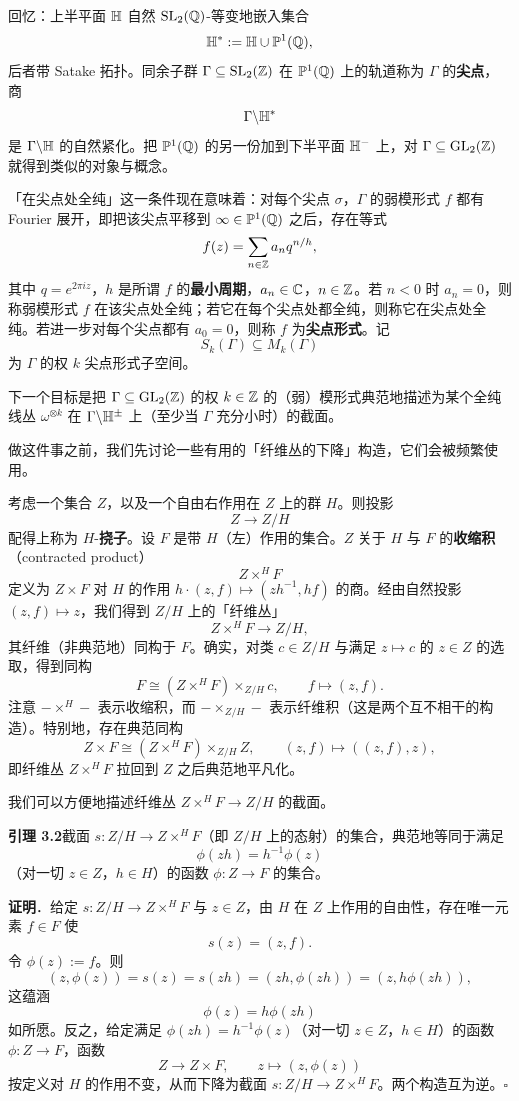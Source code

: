 回忆：上半平面 $\mathbb{H}$ 自然 $\operatorname{SL}_2(\mathbb{Q})$-等变地嵌入集合
\[
\mathbb{H}^*:=\mathbb{H}\cup\mathbb{P}^1(\mathbb{Q}),
\]
后者带 Satake 拓扑。同余子群 $\Gamma\subseteq\operatorname{SL}_2(\mathbb{Z})$ 在 $\mathbb{P}^1(\mathbb{Q})$ 上的轨道称为 $\Gamma$ 的\textbf{尖点}，商
\[
\Gamma\backslash\mathbb{H}^*
\]
是 $\Gamma\backslash\mathbb{H}$ 的自然紧化。把 $\mathbb{P}^1(\mathbb{Q})$ 的另一份加到下半平面 $\mathbb{H}^-$ 上，对 $\Gamma\subseteq\operatorname{GL}_2(\mathbb{Z})$ 就得到类似的对象与概念。

「在尖点处全纯」这一条件现在意味着：对每个尖点 $\sigma$，$\Gamma$ 的弱模形式 $f$ 都有 Fourier 展开，即把该尖点平移到 $\infty\in\mathbb{P}^1(\mathbb{Q})$ 之后，存在等式
\[
f(z)=\sum_{n\in\mathbb{Z}}a_nq^{n/h},
\]
其中 $q=e^{2\pi iz}$，$h$ 是所谓 $f$ 的\textbf{最小周期}，$a_n\in\mathbb{C}$，$n\in\mathbb{Z}$。若 $n<0$ 时 $a_n=0$，则称弱模形式 $f$ 在该尖点处全纯；若它在每个尖点处都全纯，则称它在尖点处全纯。若进一步对每个尖点都有 $a_0=0$，则称 $f$ 为\textbf{尖点形式}。记
\[
S_k(\Gamma)\subseteq M_k(\Gamma)
\]
为 $\Gamma$ 的权 $k$ 尖点形式子空间。

下一个目标是把 $\Gamma\subseteq\operatorname{GL}_2(\mathbb{Z})$ 的权 $k\in\mathbb{Z}$ 的（弱）模形式典范地描述为某个全纯线丛
$\omega^{\otimes k}$ 在 $\Gamma\backslash\mathbb{H}^\pm$ 上（至少当 $\Gamma$ 充分小时）的截面。

做这件事之前，我们先讨论一些有用的「纤维丛的下降」构造，它们会被频繁使用。

考虑一个集合 $Z$，以及一个自由右作用在 $Z$ 上的群 $H$。则投影
\[
Z\to Z/H
\]
配得上称为 $H$-\textbf{挠子}。设 $F$ 是带 $H$（左）作用的集合。$Z$ 关于 $H$ 与 $F$ 的\textbf{收缩积}（contracted product）
\[
Z\times^HF
\]
定义为 $Z\times F$ 对 $H$ 的作用 $h\cdot(z,f)\mapsto(zh^{-1},hf)$ 的商。经由自然投影 $(z,f)\mapsto z$，我们得到 $Z/H$ 上的「纤维丛」
\[
Z\times^HF\to Z/H,
\]
其纤维（非典范地）同构于 $F$。确实，对类 $c\in Z/H$ 与满足 $z\mapsto c$ 的 $z\in Z$ 的选取，得到同构
\[
F\cong(Z\times^HF)\times_{Z/H}c,\qquad f\mapsto(z,f).
\]
注意 $-\times^H-$ 表示收缩积，而 $-\times_{Z/H}-$ 表示纤维积（这是两个互不相干的构造）。特别地，存在典范同构
\[
Z\times F\cong(Z\times^HF)\times_{Z/H}Z,\qquad(z,f)\mapsto((z,f),z),
\]
即纤维丛 $Z\times^HF$ 拉回到 $Z$ 之后典范地平凡化。

我们可以方便地描述纤维丛 $Z\times^HF\to Z/H$ 的截面。

\noindent\textbf{引理 3.2}\label{lem:3.2}\quad 截面 $s:Z/H\to Z\times^HF$（即 $Z/H$ 上的态射）的集合，典范地等同于满足
\[
\phi(zh)=h^{-1}\phi(z)
\]
（对一切 $z\in Z$，$h\in H$）的函数 $\phi:Z\to F$ 的集合。

\noindent\textbf{证明}．给定 $s:Z/H\to Z\times^HF$ 与 $z\in Z$，由 $H$ 在 $Z$ 上作用的自由性，存在唯一元素 $f\in F$ 使
\[
s(z)=(z,f).
\]
令 $\phi(z):=f$。则
\[
(z,\phi(z))=s(z)=s(zh)=(zh,\phi(zh))=(z,h\phi(zh)),
\]
这蕴涵
\[
\phi(z)=h\phi(zh)
\]
如所愿。反之，给定满足 $\phi(zh)=h^{-1}\phi(z)$（对一切 $z\in Z$，$h\in H$）的函数 $\phi:Z\to F$，函数
\[
Z\to Z\times F,\qquad z\mapsto(z,\phi(z))
\]
按定义对 $H$ 的作用不变，从而下降为截面 $s:Z/H\to Z\times^HF$。两个构造互为逆。\hfill$\square$

